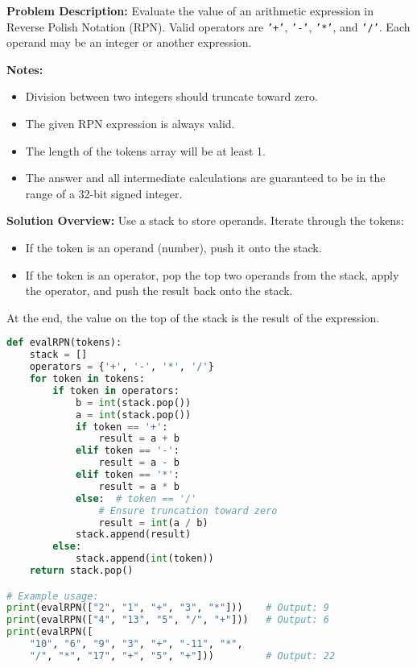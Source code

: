 

\textbf{Problem Description:}  
Evaluate the value of an arithmetic expression in Reverse Polish Notation (RPN). Valid operators are \texttt{'+'}, \texttt{'-'}, \texttt{'*'}, and \texttt{'/'}. Each operand may be an integer or another expression.

\textbf{Notes:}
\begin{itemize}
    \item Division between two integers should truncate toward zero.
    \item The given RPN expression is always valid.
    \item The length of the tokens array will be at least 1.
    \item The answer and all intermediate calculations are guaranteed to be in the range of a 32-bit signed integer.
\end{itemize}

\textbf{Solution Overview:}  
Use a stack to store operands. Iterate through the tokens:
\begin{itemize}
    \item If the token is an operand (number), push it onto the stack.
    \item If the token is an operator, pop the top two operands from the stack, apply the operator, and push the result back onto the stack.
\end{itemize}
At the end, the value on the top of the stack is the result of the expression.

\begin{fullwidth}
\begin{lstlisting}[language=Python]
def evalRPN(tokens):
    stack = []
    operators = {'+', '-', '*', '/'}
    for token in tokens:
        if token in operators:
            b = int(stack.pop())
            a = int(stack.pop())
            if token == '+':
                result = a + b
            elif token == '-':
                result = a - b
            elif token == '*':
                result = a * b
            else:  # token == '/'
                # Ensure truncation toward zero
                result = int(a / b)
            stack.append(result)
        else:
            stack.append(int(token))
    return stack.pop()

# Example usage:
print(evalRPN(["2", "1", "+", "3", "*"]))    # Output: 9
print(evalRPN(["4", "13", "5", "/", "+"]))   # Output: 6
print(evalRPN([
    "10", "6", "9", "3", "+", "-11", "*",
    "/", "*", "17", "+", "5", "+"]))         # Output: 22
\end{lstlisting}
\end{fullwidth}
